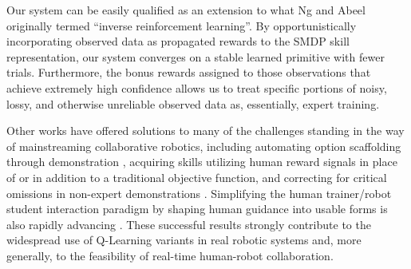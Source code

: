 \documentclass[letterpaper]{article}
\begin{document}
Our system can be easily qualified as an extension to what Ng and Abeel  originally termed ``inverse reinforcement learning''.  By opportunistically incorporating observed data as propagated rewards to the SMDP skill representation, our system converges on a stable learned primitive with fewer trials.  Furthermore, the bonus rewards assigned to those observations that achieve extremely high confidence allows us to treat specific portions of noisy, lossy, and otherwise unreliable observed data as, essentially, expert training.

Other works have offered solutions to many of the challenges standing in the way of mainstreaming collaborative robotics, including automating option scaffolding through demonstration \cite{AutoSkillAcquisition}, acquiring skills utilizing human reward signals in place of \cite{TAMER} or in addition to \cite{TeacherRL} a traditional objective function, and correcting for critical omissions in non-expert demonstrations \cite{PerspectiveTaking}. Simplifying the human trainer/robot student interaction paradigm by shaping human guidance into usable forms is also rapidly advancing \cite{TAMER,Clicker,AdviceTaking,TeacherRL,DemonstrationRL}. These successful results strongly contribute to the widespread use of Q-Learning variants in real robotic systems and, more generally, to the feasibility of real-time human-robot collaboration.



\end{document}
